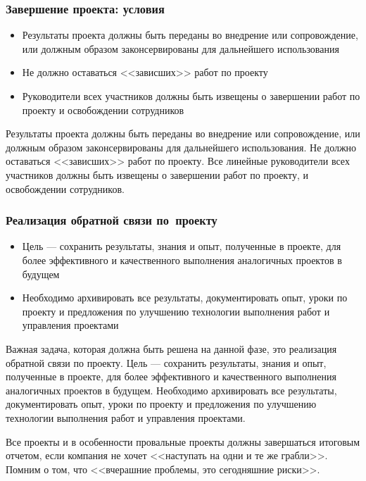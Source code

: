 \documentclass{../industrial-development}
\begin{document}
    \begin{frame} \frametitle{Завершение проекта: условия}
        \begin{itemize}
            \item Результаты проекта должны быть переданы во внедрение или сопровождение, или должным образом законсервированы для дальнейшего использования
            \item Не должно оставаться <<зависших>> работ по проекту
            \item Руководители всех участников должны быть извещены о завершении работ по проекту и освобождении сотрудников
        \end{itemize}
    \end{frame}
    \lecturenotes
Результаты проекта должны быть переданы во внедрение или сопровождение, или должным образом законсервированы для дальнейшего использования. Не должно оставаться <<зависших>> работ по проекту. Все линейные руководители всех участников должны быть извещены о завершении работ по проекту, и освобождении сотрудников.

    \begin{frame} \frametitle{Реализация обратной связи по~проекту}
        \begin{itemize}
            \item Цель — сохранить результаты, знания и опыт, полученные в проекте, для более эффективного и качественного выполнения аналогичных проектов в будущем
            \item Необходимо архивировать все результаты, документировать опыт, уроки по проекту и предложения по улучшению технологии выполнения работ и управления проектами
        \end{itemize}
    \end{frame}
    \lecturenotes
Важная задача, которая должна быть решена на данной фазе, это реализация обратной связи по проекту. Цель — сохранить результаты, знания и опыт, полученные в проекте, для более эффективного и качественного выполнения аналогичных проектов в будущем. Необходимо архивировать все результаты, документировать опыт, уроки по проекту и предложения по улучшению технологии выполнения работ и управления проектами.

Все проекты и в особенности провальные проекты должны завершаться итоговым отчетом, если компания не хочет <<наступать на одни и те же грабли>>. Помним о том, что <<вчерашние проблемы, это сегодняшние риски>>.
\end{document}
